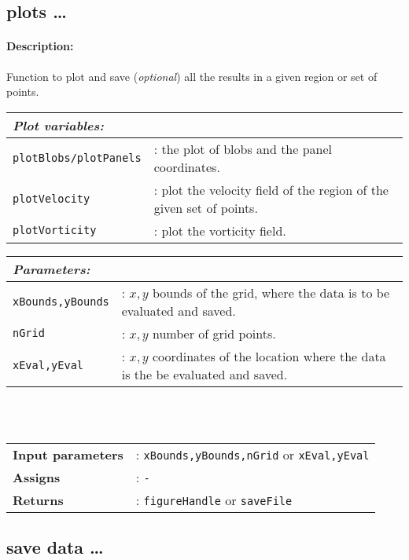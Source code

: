 \subsection{plots \ldots}
	\paragraph{Description:} Function to plot and save (\textit{optional}) all the results in a given region or set of points.\\
	
		\begin{tabular}{lp{10cm}}
			\textit{Plot variables:} & \\ \hline
			\texttt{plotBlobs/plotPanels} &: the plot of blobs and the panel coordinates.\\
			\texttt{plotVelocity} &: plot the velocity field of the region of the given set of points.\\ 
			\texttt{plotVorticity} &: plot the vorticity field.\\ 
		\end{tabular} \vspace{5 mm}
		
		\begin{tabular}{lp{10cm}}
			\textit{Parameters:} & \\ \hline
			\texttt{xBounds,yBounds} &: $x,y$ bounds of the grid, where the data is to be evaluated and saved.\\ 
			\texttt{nGrid} &: $x,y$ number of grid points.\\ 
			\texttt{xEval,yEval} &: $x,y$ coordinates of the location where the data is the be evaluated and saved.\\ 
		\end{tabular} \vspace{5 mm}\\
	\\
	\begin{tabular}{lp{10cm}}
		\textbf{Input parameters} &: \texttt{xBounds,yBounds,nGrid} or \texttt{xEval,yEval}\\ 
		\textbf{Assigns} &: \texttt{-}\\ 			
		\textbf{Returns} &: \texttt{figureHandle} or \texttt{saveFile}\\ 					
	\end{tabular}						

\subsection{save data \ldots}
